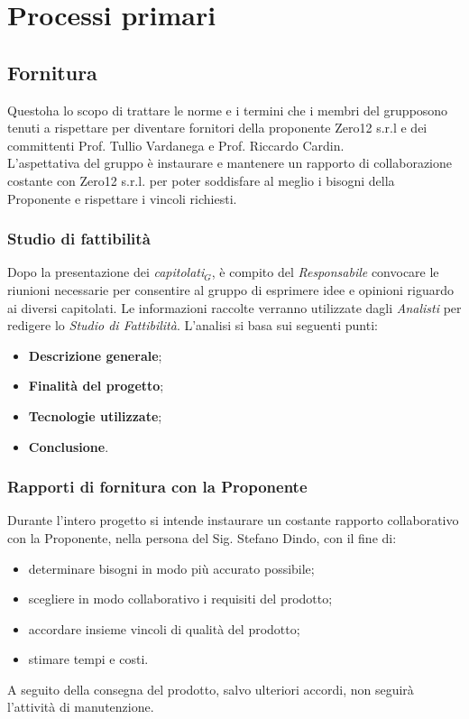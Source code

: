 \chapter{Processi primari}
\section{Fornitura}			
Questoha lo scopo di trattare le norme e i termini che i membri del grupposono tenuti a rispettare per diventare fornitori della proponente Zero12 s.r.l e dei committenti Prof. Tullio Vardanega e Prof. Riccardo Cardin. \\
L'aspettativa del gruppo è instaurare e mantenere un rapporto di collaborazione costante con Zero12 s.r.l. per poter soddisfare al meglio i bisogni della Proponente e rispettare i vincoli richiesti.
\subsection{Studio di fattibilità} 
Dopo la presentazione dei \textit{capitolati$_{G}$}, è compito del \textit{Responsabile} convocare le riunioni necessarie per consentire al gruppo di esprimere idee e opinioni riguardo ai diversi capitolati. Le informazioni raccolte verranno utilizzate dagli \textit{Analisti} per redigere lo \textit{Studio di Fattibilità}. L'analisi si basa sui seguenti punti:
\begin{itemize}
	\item \textbf{Descrizione generale};
	\item \textbf{Finalità del progetto};
	\item \textbf{Tecnologie utilizzate};
	\item \textbf{Conclusione}.
\end{itemize}
\subsection{Rapporti di fornitura con la Proponente}
Durante l'intero progetto si intende instaurare un costante rapporto collaborativo con la Proponente, nella persona del Sig. Stefano Dindo, con il fine di:
\begin{itemize}
	\item determinare bisogni in modo più accurato possibile;
	\item scegliere in modo collaborativo i requisiti del prodotto;
	\item accordare insieme vincoli di qualità del prodotto;
	\item stimare tempi e costi.
\end{itemize}
A seguito della consegna del prodotto, salvo ulteriori accordi, non seguirà l'attività di manutenzione.
